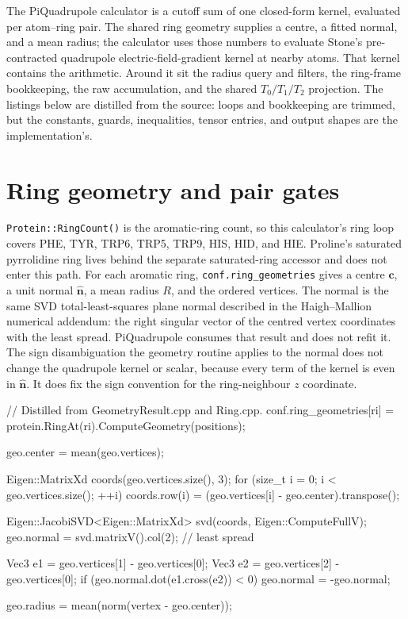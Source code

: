 \documentclass[11pt]{article}
\newcommand{\code}[1]{\texttt{#1}}
\begin{document}

The PiQuadrupole calculator is a cutoff sum of one closed-form kernel,
evaluated per atom--ring pair. The shared ring geometry supplies a centre, a
fitted normal, and a mean radius; the calculator uses those numbers to evaluate
Stone's pre-contracted quadrupole electric-field-gradient kernel at nearby
atoms. That kernel contains the arithmetic. Around it sit the radius query and filters, the ring-frame
bookkeeping, the raw accumulation, and the shared \(T_0/T_1/T_2\) projection. The listings
below are distilled from the source: loops and bookkeeping are trimmed, but the
constants, guards, inequalities, tensor entries, and output shapes are the
implementation's.

\section{Ring geometry and pair gates}

\code{Protein::RingCount()} is the aromatic-ring count, so this calculator's
ring loop covers PHE, TYR, TRP6, TRP5, TRP9, HIS, HID, and HIE. Proline's
saturated pyrrolidine ring lives behind the separate saturated-ring accessor
and does not enter this path. For each aromatic ring,
\code{conf.ring\_geometries} gives a centre \(\bm c\), a unit normal
\(\hat{\bm n}\), a mean radius \(R\), and the ordered vertices. The normal is
the same SVD total-least-squares plane normal described in the Haigh--Mallion
numerical addendum: the right singular vector of the centred vertex
coordinates with the least spread. PiQuadrupole consumes that result and does
not refit it. The sign disambiguation the geometry routine applies to the
normal does not change the quadrupole kernel or scalar, because every term of
the kernel is even in \(\hat{\bm n}\). It does fix the sign convention for the
ring-neighbour \(z\) coordinate.

\begin{codebox}
// Distilled from GeometryResult.cpp and Ring.cpp.
conf.ring_geometries[ri] =
    protein.RingAt(ri).ComputeGeometry(positions);

geo.center = mean(geo.vertices);

Eigen::MatrixXd coords(geo.vertices.size(), 3);
for (size_t i = 0; i < geo.vertices.size(); ++i)
    coords.row(i) = (geo.vertices[i] - geo.center).transpose();

Eigen::JacobiSVD<Eigen::MatrixXd> svd(coords, Eigen::ComputeFullV);
geo.normal = svd.matrixV().col(2);       // least spread

Vec3 e1 = geo.vertices[1] - geo.vertices[0];
Vec3 e2 = geo.vertices[2] - geo.vertices[0];
if (geo.normal.dot(e1.cross(e2)) < 0) geo.normal = -geo.normal;

geo.radius = mean(norm(vertex - geo.center));
\end{codebox}
\end{document}
